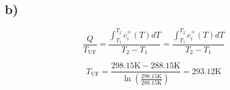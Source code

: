 

\subsection*{b)}

\begin{equation*}
\frac{\dot{Q}}{T_{\text{UF}}} = \frac{\int_{T_1}^{T_2} c_i^+ (T) dT}{T_2 - T_1} = \frac{\int_{T_1}^{T_2} c_i^+ (T) dT}{T_2 - T_1}
\end{equation*}

\begin{equation*}
T_{\text{UF}} = \frac{298.15 \text{K} - 288.15 \text{K}}{\ln \left( \frac{298.15 \text{K}}{288.15 \text{K}} \right)} = 293.12 \text{K}
\end{equation*}